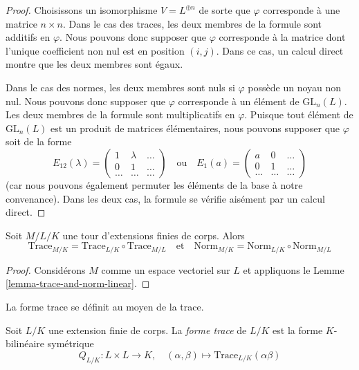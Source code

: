 \begin{proof}
Choisissons un isomorphisme $V = L^{\oplus n}$ de sorte que $\varphi$ corresponde
à une matrice $n \times n$. Dans le cas des traces, les deux membres de la formule
sont additifs en $\varphi$. Nous pouvons donc supposer que $\varphi$
corresponde à la matrice dont l'unique coefficient non nul est en position $(i, j)$.
Dans ce cas, un calcul direct montre que les deux membres sont égaux.

\medskip\noindent
Dans le cas des normes, les deux membres sont nuls si $\varphi$ possède un noyau non nul.
Nous pouvons donc supposer que $\varphi$ corresponde à un élément de
$\text{GL}_n(L)$. Les deux membres de la formule sont multiplicatifs en $\varphi$.
Puisque tout élément de $\text{GL}_n(L)$ est un produit de matrices
élémentaires, nous pouvons supposer que $\varphi$ soit de la forme
$$
E_{12}(\lambda) =
\left(
\begin{matrix}
1 & \lambda & \ldots \\
0 & 1 & \ldots \\
\ldots & \ldots & \ldots
\end{matrix}
\right)
\quad\text{ou}\quad
E_1(a) =
\left(
\begin{matrix}
a & 0 & \ldots \\
0 & 1 & \ldots \\
\ldots & \ldots & \ldots
\end{matrix}
\right)
$$
(car nous pouvons également permuter les éléments de la base à notre convenance).
Dans les deux cas, la formule se vérifie aisément par un calcul direct.
\end{proof}

\begin{lemma}
\label{lemma-trace-and-norm-tower}
Soit $M/L/K$ une tour d'extensions finies de corps. Alors
$$
\text{Trace}_{M/K} = \text{Trace}_{L/K} \circ \text{Trace}_{M/L}
\quad\text{et}\quad
\text{Norm}_{M/K} = \text{Norm}_{L/K} \circ \text{Norm}_{M/L}
$$
\end{lemma}

\begin{proof}
Considérons $M$ comme un espace vectoriel sur $L$ et appliquons le
Lemme \ref{lemma-trace-and-norm-linear}.
\end{proof}

\noindent
La forme trace se définit au moyen de la trace.

\begin{definition}
\label{definition-trace-pairing}
Soit $L/K$ une extension finie de corps. La {\it forme trace}
de $L/K$ est la forme $K$-bilinéaire symétrique
$$
Q_{L/K} : L \times L \longrightarrow K,\quad
(\alpha, \beta) \longmapsto \text{Trace}_{L/K}(\alpha\beta)
$$
\end{definition}

